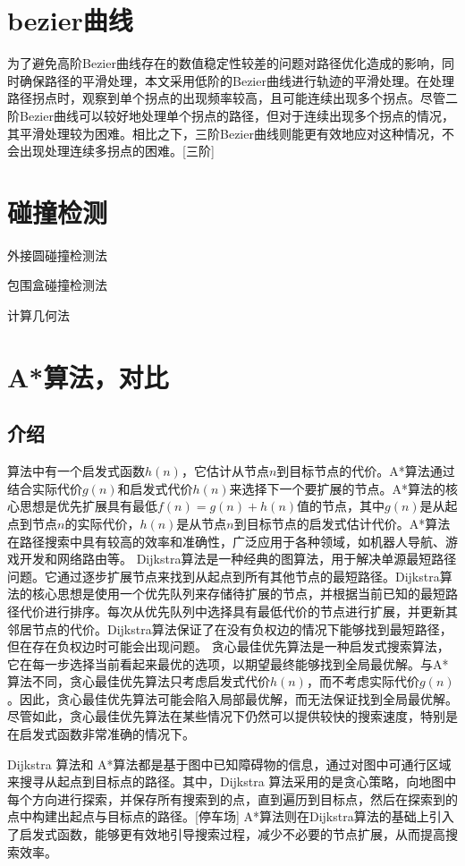 \documentclass{article}
\begin{document}
\section{bezier曲线}
为了避免高阶Bezier曲线存在的数值稳定性较差的问题对路径优化造成的影响，同时确保路径的平滑处理，本文采用低阶的Bezier曲线进行轨迹的平滑处理。在处理路径拐点时，观察到单个拐点的出现频率较高，且可能连续出现多个拐点。尽管二阶Bezier曲线可以较好地处理单个拐点的路径，但对于连续出现多个拐点的情况，其平滑处理较为困难。相比之下，三阶Bezier曲线则能更有效地应对这种情况，不会出现处理连续多拐点的困难。[三阶]

\section{碰撞检测}
外接圆碰撞检测法

包围盒碰撞检测法

计算几何法




\section{A*算法，对比}
\subsection{介绍}
算法中有一个启发式函数$h(n)$，它估计从节点$n$到目标节点的代价。A*算法通过结合实际代价$g(n)$和启发式代价$h(n)$来选择下一个要扩展的节点。A*算法的核心思想是优先扩展具有最低$f(n) = g(n) + h(n)$值的节点，其中$g(n)$是从起点到节点$n$的实际代价，$h(n)$是从节点$n$到目标节点的启发式估计代价。A*算法在路径搜索中具有较高的效率和准确性，广泛应用于各种领域，如机器人导航、游戏开发和网络路由等。
Dijkstra算法是一种经典的图算法，用于解决单源最短路径问题。它通过逐步扩展节点来找到从起点到所有其他节点的最短路径。Dijkstra算法的核心思想是使用一个优先队列来存储待扩展的节点，并根据当前已知的最短路径代价进行排序。每次从优先队列中选择具有最低代价的节点进行扩展，并更新其邻居节点的代价。Dijkstra算法保证了在没有负权边的情况下能够找到最短路径，但在存在负权边时可能会出现问题。
贪心最佳优先算法是一种启发式搜索算法，它在每一步选择当前看起来最优的选项，以期望最终能够找到全局最优解。与A*算法不同，贪心最佳优先算法只考虑启发式代价$h(n)$，而不考虑实际代价$g(n)$。因此，贪心最佳优先算法可能会陷入局部最优解，而无法保证找到全局最优解。尽管如此，贪心最佳优先算法在某些情况下仍然可以提供较快的搜索速度，特别是在启发式函数非常准确的情况下。

Dijkstra 算法和 A*算法都是基于图中已知障碍物的信息，通过对图中可通行区域来搜寻从起点到目标点的路径。其中，Dijkstra 算法采用的是贪心策略，向地图中每个方向进行探索，并保存所有搜索到的点，直到遍历到目标点，然后在探索到的点中构建出起点与目标点的路径。[停车场] A*算法则在Dijkstra算法的基础上引入了启发式函数，能够更有效地引导搜索过程，减少不必要的节点扩展，从而提高搜索效率。
\end{document}
